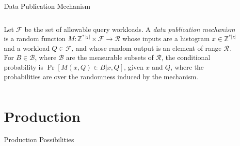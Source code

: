 \begin{frame}{Data Publication Mechanism}
\begin{columns}[T] %
\begin{column}{.58\textwidth}
	\begin{definition}
	\label{def:query_mechanism} Let $\mathcal{F}$ be the set of allowable query workloads.
	A \emph{data publication mechanism} is a random function
	$M:\mathbb{Z}^{\ast |\chi|}\times \mathcal{F}\rightarrow \mathcal{R}$ whose
	inputs are a histogram $x\in \mathbb{Z}^{\ast |\chi |}$ and a workload $Q \in  \mathcal{F}$,
	and whose random output is an element of range $\mathcal{R}$.
	For  $B \in \mathcal{B}$, where $\mathcal{B}$ are the measurable subsets of $\mathcal{R}$,
	the conditional probability is $\Pr \left[ M(x,Q)\in B | x,Q \right] $, given $x$ and $Q$, where
	the probabilities are over the randomness induced by the mechanism.
	\end{definition}
\end{column}%
\hfill%
\begin{column}{.38\textwidth}
\end{column}%
\end{columns}
\end{frame}

\section{Production}
\begin{transitionframe}
  \begin{center}
    \Huge Production Possibilities
  \end{center}
\end{transitionframe}

